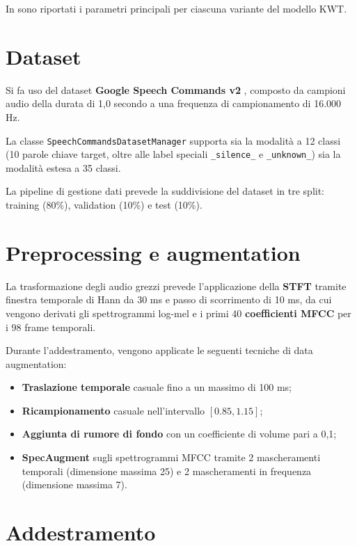 \documentclass[11pt, a4paper]{article}
\begin{document}
In  sono riportati i parametri principali per ciascuna variante del modello KWT.

\section{Dataset}

Si fa uso del dataset \textbf{Google Speech Commands v2} \cite{warden2018speechcommandsdatasetlimitedvocabulary}, composto da campioni audio della durata di 1,0 secondo a una frequenza di campionamento di 16.000 Hz.

La classe \texttt{SpeechCommandsDatasetManager} supporta sia la modalità a 12 classi (10 parole chiave target, oltre alle label speciali \texttt{\_silence\_} e \texttt{\_unknown\_}) sia la modalità estesa a 35 classi.

La pipeline di gestione dati prevede la suddivisione del dataset in tre split: training (80\%), validation (10\%) e test (10\%).

\section{Preprocessing e augmentation}

La trasformazione degli audio grezzi prevede l'applicazione della \textbf{STFT} tramite finestra temporale di Hann da 30 ms e passo di scorrimento di 10 ms, da cui vengono derivati gli spettrogrammi log-mel e i primi 40 \textbf{coefficienti MFCC} per i 98 frame temporali.

Durante l'addestramento, vengono applicate le seguenti tecniche di data augmentation:
\begin{itemize}
  \item \textbf{Traslazione temporale} casuale fino a un massimo di 100 ms;
  \item \textbf{Ricampionamento} casuale nell'intervallo $[0.85, 1.15]$;
  \item \textbf{Aggiunta di rumore di fondo} con un coefficiente di volume pari a 0,1;
  \item \textbf{SpecAugment} \cite{Park_2019} sugli spettrogrammi MFCC tramite 2 mascheramenti temporali (dimensione massima 25) e 2 mascheramenti in frequenza (dimensione massima 7).
\end{itemize}

\section{Addestramento}
\end{document}

